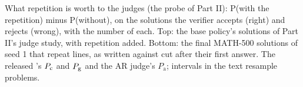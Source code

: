 \begin{table}[t]
\centering\small

\caption{What repetition is worth to the judges (the probe of Part II): P(with the repetition) minus P(without), on the
solutions the verifier accepts (right) and rejects (wrong), with the number of each. Top: the base policy's solutions
of Part II's judge study, with repetition added. Bottom: the final MATH-500 solutions of seed 1 that repeat lines, as
written against cut after their first answer. The released \kev{}'s $\pc$ and $\pg$ and the AR judge's
$P_{\mathrm{a}}$; intervals in the text resample problems.}
\label{tab:repeat-probe}
\end{table}
